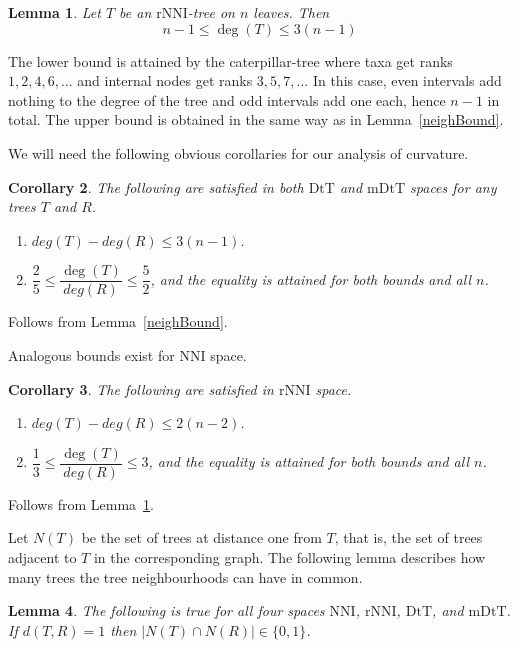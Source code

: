 \documentclass{amsart}
\newtheorem{lemma}{Lemma}
\newtheorem{corollary}[lemma]{Corollary}
\newcommand{\dts}{\mathrm{DtT}}
\newcommand{\nni}{\mathrm{NNI}}
\newcommand{\rnni}{\mathrm{rNNI}}
\newcommand{\mdts}{\mathrm{mDtT}}
\begin{document}
\begin{lemma}\label{cor_deg_rNNI}
Let $T$ be an $\rnni$-tree on $n$ leaves. Then \[n-1\leq \deg(T)\leq3(n-1)\]
\end{lemma}

\proof
The lower bound is attained by the caterpillar-tree where taxa get ranks $1, 2, 4, 6, \ldots$ and internal nodes get ranks $3, 5, 7, \ldots$
In this case, even intervals  add nothing to the degree of the tree and odd intervals add one each, hence $n-1$ in total.
The upper bound is obtained in the same way as in Lemma~\ref{neighBound}.
\endproof

We will need the following obvious corollaries for our analysis of curvature.

\begin{corollary}\label{degreeBounds}
The following are satisfied in both $\dts$ and $\mdts$ spaces for any trees $T$ and $R$.
\begin{enumerate}[(1)]
\item $deg(T)-deg(R) \leq 3(n-1)$.
\item $\dfrac25 \leq \dfrac{\deg(T)}{deg(R)} \leq \dfrac52$, and the equality is attained for both bounds and all $n$.
\end{enumerate}
\end{corollary}

\proof
Follows from Lemma~\ref{neighBound}.
\endproof

Analogous bounds exist for $\nni$ space.

\begin{corollary}\label{degreeBoundsNNI}
The following are satisfied in $\rnni$ space.
\begin{enumerate}[(1)]
\item $deg(T)-deg(R) \leq 2(n-2)$.
\item $\dfrac13 \leq \dfrac{\deg(T)}{deg(R)} \leq 3$, and the equality is attained for both bounds and all $n$.
\end{enumerate}
\end{corollary}

\proof
Follows from Lemma~\ref{cor_deg_rNNI}.
\endproof

Let $N(T)$ be the set of trees at distance one from $T$, that is, the set of trees adjacent to $T$ in the corresponding graph.
The following lemma describes how many trees the tree neighbourhoods can have in common.

\begin{lemma}\label{intersecNeighb}
The following is true for all four spaces $\nni$, $\rnni$, $\dts$, and $\mdts$.
If $d(T,R) = 1$ then $|N(T)\cap N(R)|\in\{0,1\}$.
\end{lemma}
\end{document}
